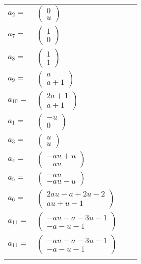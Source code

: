 \documentclass[1p]{elsarticle_modified}
\theoremstyle{definition}
\begin{document}
\begin{tabular}{m{7pt} m{180pt} m{7pt} m{180pt} }
\flushright $a_{2}=$&$\begin{pmatrix}0\\u\end{pmatrix}$ \\
\flushright $a_{7}=$&$\begin{pmatrix}1\\0\end{pmatrix}$ \\
\flushright $a_{8}=$&$\begin{pmatrix}1\\1\end{pmatrix}$ \\
\flushright $a_{9}=$&$\begin{pmatrix}a\\a+1\end{pmatrix}$ \\
\flushright $a_{10}=$&$\begin{pmatrix}2 a+1\\a+1\end{pmatrix}$ \\
\flushright $a_{1}=$&$\begin{pmatrix}- u\\0\end{pmatrix}$ \\
\flushright $a_{3}=$&$\begin{pmatrix}u\\u\end{pmatrix}$ \\
\flushright $a_{4}=$&$\begin{pmatrix}- a u+u\\- a u\end{pmatrix}$ \\
\flushright $a_{5}=$&$\begin{pmatrix}- a u\\- a u- u\end{pmatrix}$ \\
\flushright $a_{6}=$&$\begin{pmatrix}2 a u- a+2 u-2\\a u+u-1\end{pmatrix}$ \\
\flushright $a_{11}=$&$\begin{pmatrix}- a u- a-3 u-1\\- a- u-1\end{pmatrix}$\\ \flushright $a_{11}=$&$\begin{pmatrix}- a u- a-3 u-1\\- a- u-1\end{pmatrix}$\\&\end{tabular}
\end{document}
